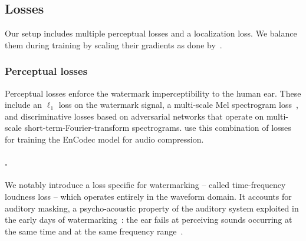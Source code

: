 \subsection{Losses} 

Our setup includes multiple perceptual losses and a localization loss. 
We balance them during training by scaling their gradients as done by~\citet{defossez2022high}.


\subsubsection*{Perceptual losses} 

Perceptual losses enforce the watermark imperceptibility to the human ear.
These include an $\ell_1$ loss on the watermark signal, a multi-scale Mel spectrogram loss~\citep{gritsenko2020spectral}, and discriminative losses based on adversarial networks that operate on multi-scale short-term-Fourier-transform spectrograms. 
\citet{defossez2022high} use this combination of losses for training the EnCodec model for audio compression. 

\paragraph*{\ploss.}\label{chap4/app:loudness}
We notably introduce a loss specific for watermarking -- called time-frequency loudness loss -- which operates entirely in the waveform domain. 
It accounts for auditory masking, a psycho-acoustic property of the auditory system exploited in the early days of watermarking~\citep{blockrep1-Kirovski2003}: the ear fails at perceiving sounds occurring at the same time and at the same frequency range~\citep{book:audio}.

